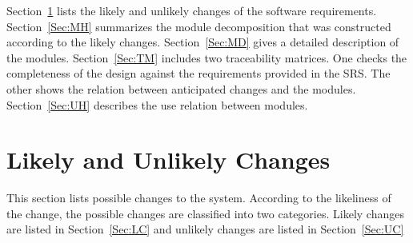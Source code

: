 \documentclass[12pt]{article}
\begin{document}
Section~\ref{Sec:LaUC}  lists the likely and unlikely changes of the software requirements. Section~\ref{Sec:MH}  summarizes the module decomposition that was constructed according to the likely changes. Section~\ref{Sec:MD}  gives a detailed description of the modules. Section~\ref{Sec:TM}  includes two traceability matrices. One checks the completeness of the design against the requirements provided in the SRS. The other shows the relation between anticipated changes and the modules. Section~\ref{Sec:UH}  describes the use relation between modules.
\section{Likely and Unlikely Changes}
\label{Sec:LaUC}
This section lists possible changes to the system. According to the likeliness of the change, the possible changes are classified into two categories. Likely changes are listed in Section~\ref{Sec:LC} and unlikely changes are listed in Section~\ref{Sec:UC}
\end{document}
